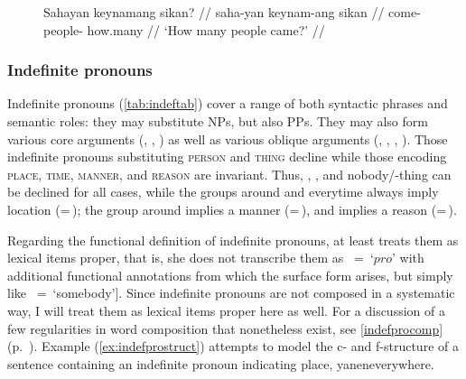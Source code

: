 \begin{figure}
\ex\label{ex:sikanadj}%
\begingl
	\gla Sahayan keynamang sikan? //
	\glb saha-yan keynam-ang sikan //
	\glc come-\TplM{} people-\Aarg{} how.many //
	\glft `How many people came?' //
\endgl
\xe
\end{figure}


\subsubsection{Indefinite pronouns}

Indefinite pronouns (\autoref{tab:indeftab}) cover a range of both syntactic
phrases and semantic roles: they may substitute NPs, but also PPs. They may
also form various core arguments (\Subj{}, \Obj{}, ) as well as
various oblique arguments (\Possr, , , ).
Those indefinite pronouns substituting \textsc{person} and \textsc{thing}
decline while those encoding \textsc{place}, \textsc{time}, \textsc{manner},
and \textsc{reason} are invariant. Thus, , , and
 {nobody/\mbox{-thing}} can be declined for all cases, while
the groups around  and 
{everytime} always imply location (=\,\Loc{}); the group around
 implies a manner (=\,\Ins{}), and
 implies a reason (=\,\Caus{}).

Regarding the functional definition of indefinite pronouns, at least
\citet{dalrymple2001} treats them as lexical items proper, that is, she does
not transcribe them as \ups{\Pred{}}~=~`$pro$' with additional functional
annotations from which the surface form arises, but simply like
\ups{\Pred{}}~=~`somebody']. Since indefinite pronouns are not composed in a
systematic way, I will treat them as lexical items proper here as well. For a
discussion of a few regularities in word composition that nonetheless exist,
see \autoref{indefprocomp} (p.~\pageref{indefprocomp}). Example
(\ref{ex:indefprostruct}) attempts to model the c- and f-structure of a
sentence containing an indefinite pronoun indicating place, 
{yanen}{everywhere}.

